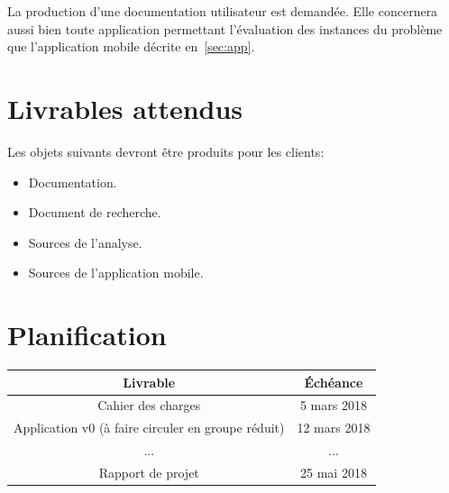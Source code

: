 \documentclass[a4paper, 11pt, titlepage, oneside]{report}
\begin{document}
	La production d’une documentation utilisateur est demandée. Elle concernera aussi bien toute application permettant l’évaluation des instances du problème que l’application mobile décrite en~\ref{sec:app}.
	
	\section{Livrables attendus}
	
	Les objets suivants devront être produits pour les clients:
	\begin{itemize}
		\item Documentation.
		\item Document de recherche.
		\item Sources de l’analyse.
		\item Sources de l’application mobile.
	\end{itemize}
	
	\section{Planification}
	
	\begin{center}
		\begin{tabular}{|c|c|}
			\hline
			\textbf{Livrable} & \textbf{Échéance} \\
			\hline
			Cahier des charges & 5 mars 2018 \\
			Application v0 (à faire circuler en groupe réduit) & 12 mars 2018 \\
			... & ... \\
			Rapport de projet & 25 mai 2018 \\
			\hline
			
		\end{tabular}
	\end{center}
\end{document}
